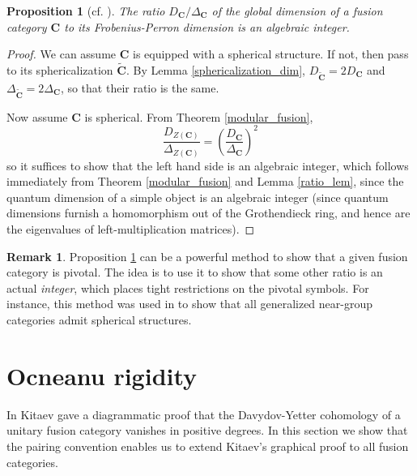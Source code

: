 \documentclass[a4paper]{article}
\theoremstyle{plain}
\newtheorem{prop}[thm]{Proposition}
\theoremstyle{definition}
\newtheorem{rem}[thm]{Remark}
\newcommand{\cat}{\mathbf}
\begin{document}
{\begin{prop}[{cf.  \cite[Prop 8.22]{eno02-ofc}}] The ratio $D_{\cat{C}} / \Delta_{\cat{C}}$ of the global dimension of a fusion category $\cat{C}$ to its Frobenius-Perron dimension is an algebraic integer. \label{alg_int}
\end{prop}
\begin{proof}


 We can assume $\cat{C}$ is equipped with a spherical structure. If not, then pass to its sphericalization $\tilde{\cat{C}}$. By Lemma \ref{sphericalization_dim}, $D_{\tilde{\cat{C}}} = 2 D_{\cat{C}}$ and $\Delta_{\tilde{\cat{C}}} = 2 \Delta_{\cat{C}}$, so that their ratio is the same.

Now assume $\cat{C}$ is spherical. From Theorem \ref{modular_fusion}, 
\[
\frac{D_{Z(\cat{C})}}{\Delta_{Z(\cat{C})}}  =  \left( \frac{ D_{\cat{C}}}{\Delta_{\cat{C}}}\right)^2
\]
so it suffices to show that the left hand side is an algebraic integer, which follows immediately from Theorem \ref{modular_fusion} and Lemma \ref{ratio_lem}, since the quantum dimension of a simple object is an algebraic integer (since quantum dimensions furnish a homomorphism out of the Grothendieck ring, and hence are the eigenvalues of left-multiplication matrices).
\end{proof}
\begin{rem} Proposition \ref{alg_int} can be a powerful method to show that a given fusion category is pivotal. The idea is to use it to show that some other ratio is an actual {\em integer}, which places tight restrictions on the pivotal symbols. For instance, this method was used in \cite{t11-obngc, thorntonthesis} to show that all generalized near-group categories admit spherical structures.
\end{rem}
}

\section{Ocneanu rigidity} \label{ocneanu_sec}
In \cite[Appendix E6]{k05-aes} Kitaev gave a diagrammatic proof that the Davydov-Yetter cohomology \cite{yetter1998-braided, yetter2003-abelian, davydov1997-twisting} of a unitary fusion category vanishes in positive degrees. In this section we show that the pairing convention enables us to extend Kitaev's graphical proof to all fusion categories. 
\end{document}
